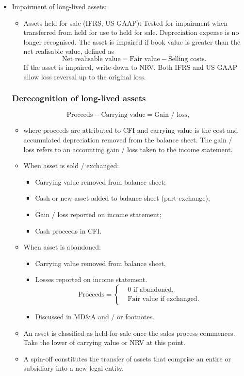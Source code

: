\documentclass[../notes_compiled.tex]{subfiles}
\begin{document}
\begin{itemize}
\item Impairment of long-lived assets:
\begin{itemize}
\item Assets held for sale (IFRS, US GAAP): Tested for impairment when transferred from held for use to held for sale. Depreciation expense is no longer recognised. The asset is impaired if book value is greater than the net realisable value, defined as
\begin{equation}
\text{Net realisable value} = \text{Fair value} - \text{Selling costs}.
\end{equation}
If the asset is impaired, write-down to NRV. Both IFRS and US GAAP allow loss reversal up to the original loss.
\end{itemize}


\subsubsection{Derecognition of long-lived assets}
\begin{equation*}
\text{Proceeds} - \text{Carrying value} = \text{Gain / loss},
\end{equation*}
\begin{itemize}
\item[] where proceeds are attributed to CFI and carrying value is the cost and accumulated depreciation removed from the balance sheet. The gain / loss refers to an accounting gain / loss taken to the income statement.
\item When asset is sold / exchanged:
\begin{itemize}
\item Carrying value removed from balance sheet;
\item Cash or new asset added to balance sheet (part-exchange);
\item Gain / loss reported on income statement;
\item Cash proceeds in CFI.
\end{itemize}
\item When asset is abandoned:
\begin{itemize}
\item Carrying value removed from balance sheet,
\item Losses reported on income statement.
\begin{equation*}
\text{Proceeds}=\begin{cases}&\text{0 if abandoned,} \\ &\text{Fair value if exchanged.} \end{cases}
\end{equation*}
\item Discussed in MD\&A and / or footnotes.
\end{itemize}
\item An asset is classified as held-for-sale once the sales process commences. Take the lower of carrying value or NRV at this point.
\item A spin-off constitutes the transfer of assets that comprise an entire or subsidiary into a new legal entity.
\end{itemize}


\end{itemize}
\end{document}
